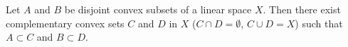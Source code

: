 Let $A$ and $B$ be disjoint convex subsets of a linear space $X$. Then there exist complementary convex sets $C$ and $D$ in $X$ ($C \cap D = \emptyset$, $C \cup D = X$) such that $A \subset C$ and $B \subset D$.
